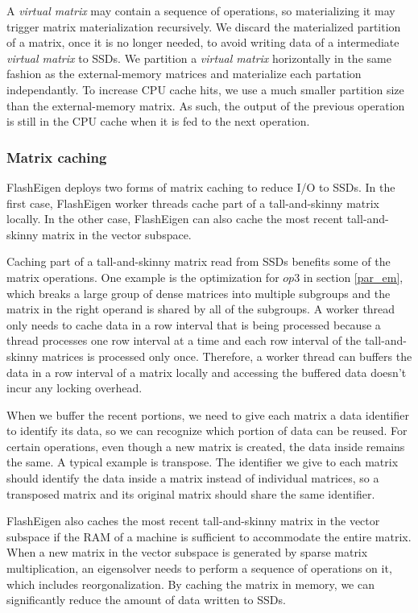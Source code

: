 A \textit{virtual matrix} may contain a sequence of operations, so materializing
it may trigger matrix materialization recursively.
We discard the materialized partition of a matrix, once it is no longer needed,
to avoid writing data of a intermediate \textit{virtual matrix} to SSDs.
We partition a \textit{virtual matrix} horizontally in the same fashion as
the external-memory matrices and materialize each partation independantly. 
To increase CPU cache hits, we use a much smaller partition size than
the external-memory matrix. As such, the output of the previous operation is
still in the CPU cache when it is fed to the next operation.

\subsubsection{Matrix caching}
FlashEigen deploys two forms of matrix caching to reduce I/O to SSDs.
In the first case, FlashEigen worker threads cache part of a tall-and-skinny
matrix locally.
In the other case, FlashEigen can also cache the most recent tall-and-skinny
matrix in the vector subspace.

Caching part of a tall-and-skinny matrix read from SSDs benefits some of
the matrix operations. One example is the optimization for $op3$ in section
\ref{par_em}, which breaks a large group of dense matrices into multiple
subgroups and the matrix in the right operand is shared by all of the subgroups.
A worker thread only needs to cache data in a row interval that is being processed
because a thread processes one row interval at a time and each row interval of
the tall-and-skinny matrices is processed only once.
Therefore, a worker thread can buffers the data in a row interval of a matrix
locally and accessing the buffered data doesn't incur any locking overhead.

When we buffer the recent portions, we need to give each matrix a data identifier
to identify its data, so we can recognize which portion of data can be reused.
For certain operations, even though a new matrix is created, the data inside
remains the same. A typical example is transpose. The identifier we give to
each matrix should identify the data inside a matrix instead of individual matrices,
so a transposed matrix and its original matrix should share the same identifier.

FlashEigen also caches the most recent tall-and-skinny matrix in the vector
subspace if the RAM of a machine is sufficient to accommodate the entire matrix.
When a new matrix in the vector subspace is generated by sparse matrix
multiplication, an eigensolver needs to perform a sequence of operations on it,
which includes reorgonalization. By caching the matrix in memory, we can
significantly reduce the amount of data written to SSDs.

